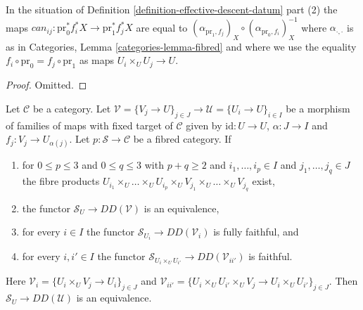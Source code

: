 \begin{lemma}
\label{lemma-trivial-cocycle}
In the situation of
Definition \ref{definition-effective-descent-datum} part (2) the maps
$can_{ij} : \text{pr}_0^*f_i^*X \to \text{pr}_1^*f_j^*X$ are equal to
$(\alpha_{\text{pr}_1, f_j})_X \circ (\alpha_{\text{pr}_0, f_i})_X^{-1}$
where $\alpha_{\cdot, \cdot}$ is as in
Categories, Lemma \ref{categories-lemma-fibred}
and where we
use the equality $f_i \circ \text{pr}_0 = f_j \circ \text{pr}_1$
as maps $U_i \times_U U_j \to U$.
\end{lemma}

\begin{proof}
Omitted.
\end{proof}

\begin{lemma}
\label{lemma-compare-descent-condition}
Let $\mathcal{C}$ be a category. Let
$\mathcal{V} = \{V_j \to U\}_{j \in J} \to
\mathcal{U} = \{U_i \to U\}_{i \in I}$
be a morphism of families of maps with fixed target of
$\mathcal{C}$ given by $\text{id} : U \to U$,
$\alpha : J \to I$ and $f_j : V_j \to U_{\alpha(j)}$. Let
$p : \mathcal{S} \to \mathcal{C}$ be a fibred category. If
\begin{enumerate}
\item for $0 \leq p \leq 3$ and $0 \leq q \leq 3$ with $p + q \geq 2$
and $i_1, \ldots, i_p \in I$ and $j_1, \ldots, j_q \in J$
the fibre products $U_{i_1} \times_U \ldots \times_U U_{i_p} \times_U
V_{j_1} \times_U \ldots \times_U V_{j_q}$ exist,
\item the functor $\mathcal{S}_U \to DD(\mathcal{V})$
is an equivalence,
\item for every $i \in I$ the functor
$\mathcal{S}_{U_i} \to DD(\mathcal{V}_i)$
is fully faithful, and
\item for every $i, i' \in I$ the functor
$\mathcal{S}_{U_i \times_U U_{i'}} \to DD(\mathcal{V}_{ii'})$
is faithful.
\end{enumerate}
Here $\mathcal{V}_i = \{U_i \times_U V_j \to U_i\}_{j \in J}$ and
$\mathcal{V}_{ii'} =
\{U_i \times_U U_{i'} \times_U V_j \to U_i \times_U U_{i'}\}_{j \in J}$.
Then $\mathcal{S}_U \to DD(\mathcal{U})$ is an equivalence.
\end{lemma}

